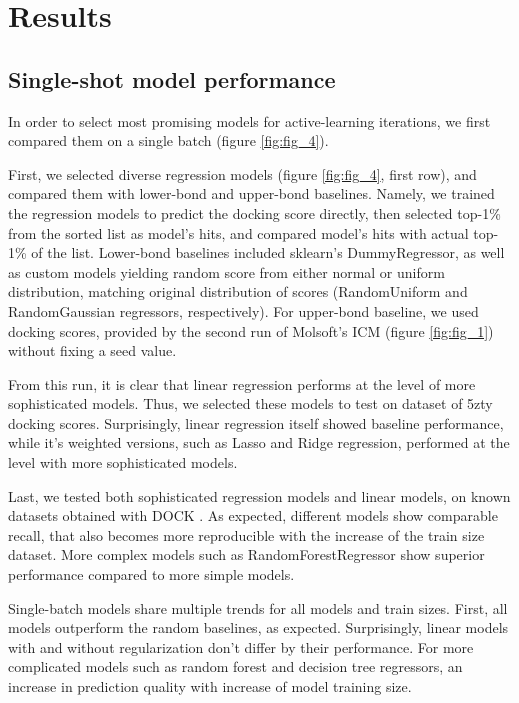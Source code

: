 \section{Results}

\subsection{Single-shot model performance}
\label{subsection:single-shot}

In order to select most promising models for active-learning iterations, we first compared them on a single batch (figure \ref{fig:fig_4}). 

First, we selected diverse regression models (figure \ref{fig:fig_4}, first row), and compared them with lower-bond and upper-bond baselines. Namely, we trained the regression models to predict the docking score directly, then selected top-1\% from the sorted list as model's hits, and compared model's hits with actual top-1\% of the list. Lower-bond baselines included sklearn's DummyRegressor, as well as custom models yielding random score from either normal or uniform distribution, matching original distribution of scores (RandomUniform and RandomGaussian regressors, respectively). For upper-bond baseline, we used docking scores, provided by the second run of Molsoft's ICM (figure \ref{fig:fig_1}) without fixing a seed value.

From this run, it is clear that linear regression performs at the level of more sophisticated models. Thus, we selected these models to test on dataset of 5zty docking scores. Surprisingly, linear regression itself showed baseline performance, while it's weighted versions, such as Lasso and Ridge regression, performed at the level with more sophisticated models.

Last, we tested both sophisticated regression models and linear models, on known datasets obtained with DOCK \cite{ultralarge_docking_first}. As expected, different models show comparable recall, that also becomes more reproducible with the increase of the train size dataset. More complex models such as RandomForestRegressor show superior performance compared to more simple models. 

Single-batch models share multiple trends for all models and train sizes. First, all models outperform the random baselines, as expected. Surprisingly, linear models with and without regularization don't differ by their performance. For more complicated models such as random forest and decision tree regressors, an increase in prediction quality with increase of model training size. 

